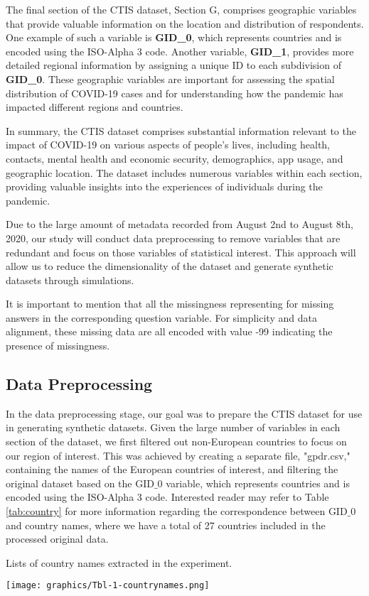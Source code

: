 The final section of the CTIS dataset, Section G, comprises geographic variables that provide valuable information on the location and distribution of respondents. One example of such a variable is \textbf{GID\_0}, which represents countries and is encoded using the ISO-Alpha 3 code. Another variable, \textbf{GID\_1}, provides more detailed regional information by assigning a unique ID to each subdivision of \textbf{GID\_0}. These geographic variables are important for assessing the spatial distribution of COVID-19 cases and for understanding how the pandemic has impacted different regions and countries.

In summary, the CTIS dataset comprises substantial information relevant to the impact of COVID-19 on various aspects of people's lives, including health, contacts, mental health and economic security, demographics, app usage, and geographic location. The dataset includes numerous variables within each section, providing valuable insights into the experiences of individuals during the pandemic.

Due to the large amount of metadata recorded from August 2nd to August 8th, 2020, our study will conduct data preprocessing to remove variables that are redundant and focus on those variables of statistical interest. This approach will allow us to reduce the dimensionality of the dataset and generate synthetic datasets through simulations.

It is important to mention that all the missingness representing for missing answers in the corresponding question variable. For simplicity and data alignment, these missing data are all encoded with value -99 indicating the presence of missingness.







\subsection{Data Preprocessing}
\label{subsec:preprocess}
In the data preprocessing stage, our goal was to prepare the CTIS dataset for use in generating synthetic datasets. Given the large number of variables in each section of the dataset, we first filtered out non-European countries to focus on our region of interest. This was achieved by creating a separate file, "gpdr.csv," containing the names of the European countries of interest, and filtering the original dataset based on the $\text{GID\_0}$ variable, which represents countries and is encoded using the ISO-Alpha 3 code. Interested reader may refer to Table \ref{tab:country} for more information regarding the correspondence between $\text{GID\_0}$ and country names, where we have a total of 27 countries included in the processed original data.
\begin{table}[H]
\centering
  \caption{Lists of country names extracted in the experiment.}
  \label{tab:country}
  \texttt{[image: graphics/Tbl-1-countrynames.png]}
\end{table}

